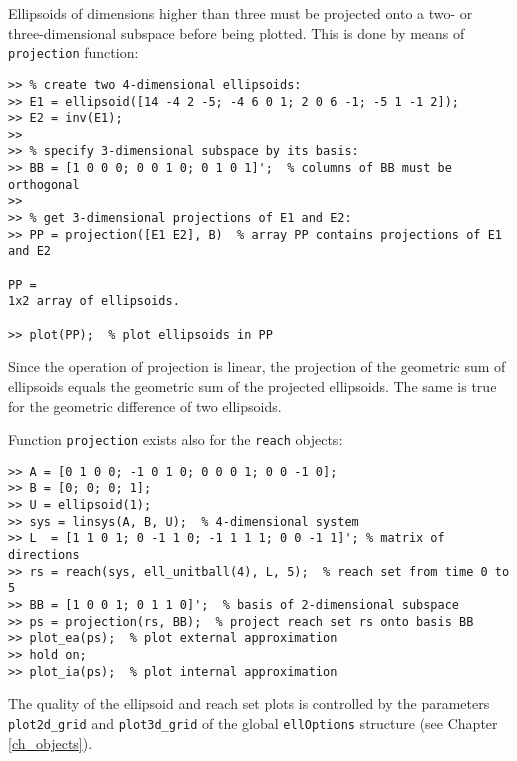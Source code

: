 Ellipsoids of dimensions higher than three must be
projected onto a two- or three-dimensional subspace before being plotted.
This is done by means of {\tt projection} function:
{\tt \begin{verbatim}
>> % create two 4-dimensional ellipsoids:
>> E1 = ellipsoid([14 -4 2 -5; -4 6 0 1; 2 0 6 -1; -5 1 -1 2]);
>> E2 = inv(E1);
>>
>> % specify 3-dimensional subspace by its basis:
>> BB = [1 0 0 0; 0 0 1 0; 0 1 0 1]';  % columns of BB must be orthogonal
>>
>> % get 3-dimensional projections of E1 and E2:
>> PP = projection([E1 E2], B)  % array PP contains projections of E1 and E2

PP =
1x2 array of ellipsoids.

>> plot(PP);  % plot ellipsoids in PP
\end{verbatim} }
Since the operation of projection is linear, the projection of the geometric
sum of ellipsoids equals the geometric sum of the projected ellipsoids.
The same is true for the geometric difference of two ellipsoids.

Function {\tt projection} exists also for the {\tt reach} objects:
{\tt \begin{verbatim}
>> A = [0 1 0 0; -1 0 1 0; 0 0 0 1; 0 0 -1 0];
>> B = [0; 0; 0; 1];
>> U = ellipsoid(1);
>> sys = linsys(A, B, U);  % 4-dimensional system
>> L  = [1 1 0 1; 0 -1 1 0; -1 1 1 1; 0 0 -1 1]'; % matrix of directions
>> rs = reach(sys, ell_unitball(4), L, 5);  % reach set from time 0 to 5
>> BB = [1 0 0 1; 0 1 1 0]';  % basis of 2-dimensional subspace
>> ps = projection(rs, BB);  % project reach set rs onto basis BB
>> plot_ea(ps);  % plot external approximation
>> hold on;
>> plot_ia(ps);  % plot internal approximation
\end{verbatim} }
The quality of the ellipsoid and reach set plots is controlled by the
parameters {\tt plot2d\_grid} and {\tt plot3d\_grid} of the global
{\tt ellOptions} structure (see Chapter \ref{ch_objects}).





